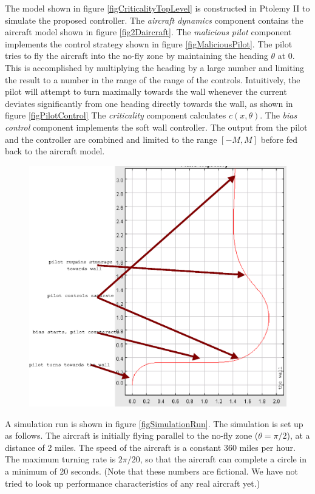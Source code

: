 \documentclass[11pt]{article}
\begin{document}
The model shown in figure \ref{figCriticalityTopLevel}
is constructed in Ptolemy II to
simulate the proposed controller. The \emph{aircraft dynamics} component
contains the
aircraft model shown in figure \ref{fig2Daircraft}. The \emph{malicious pilot}
component implements the control strategy shown in figure
\ref{figMaliciousPilot}. The pilot tries
to fly the aircraft into the no-fly zone by maintaining the heading $\theta$
at 0. This is accomplished by multiplying the heading by a large number
and limiting the result to a number in the range of the range of the
controls.  Intuitively, the pilot will attempt to turn maximally towards
the wall whenever the current deviates significantly from one heading
directly towards the wall, as shown in figure \ref{figPilotControl}
The \emph{criticality} component calculates $c(x, \theta)$. The
\emph{bias control} component implements the soft wall controller. The output
from the pilot and the controller are combined and limited to the range
$[-M, M]$ before fed back to the aircraft model.

\begin{figure}[btp]
\centering
\includegraphics[width=5in]{simulationRun.eps}
\end{figure}

A simulation run is shown in figure \ref{figSimulationRun}.
The simulation is set up as follows. The aircraft is initially flying parallel
to the no-fly zone ($\theta = \pi / 2$), at a distance of 2 miles. The speed of
the aircraft is a constant 360 miles per hour. The maximum turning rate is 
$2\pi/20$, so that the aircraft can complete a circle in a minimum of 20
seconds. (Note that these numbers are fictional. We have not tried to look up
performance characteristics of any real aircraft yet.)
\end{document}
